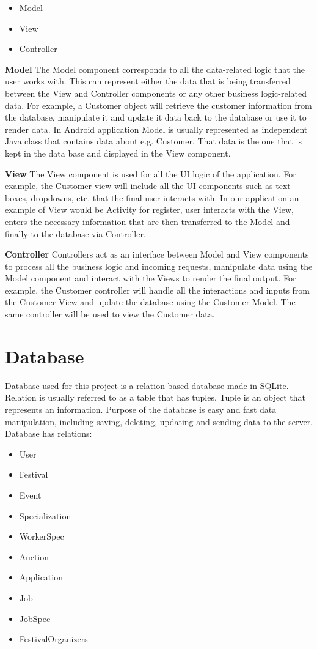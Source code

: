 		\begin{itemize}
			\item 	 Model
			\item 	 View
			\item 	 Controller		
		\end{itemize}

		\textbf{Model}
		 The Model component corresponds to all the data-related logic that the user works with. This can represent either the data that is being transferred between the View and Controller components or any other business logic-related data. For example, a Customer object will retrieve the customer information from the database, manipulate it and update it data back to the database or use it to render data. 
		In Android application Model is usually represented as independent Java class that contains data about e.g. Customer. That data is the one that is kept in the data base and displayed in the View component. 

		\textbf{View}
		 The View component is used for all the UI logic of the application. For example, the Customer view will include all the UI components such as text boxes, dropdowns, etc. that the final user interacts with. 
		In our application an example of View would be Activity for register, user interacts with the View, enters the necessary information that are then transferred to the Model and finally to the database via Controller.

		\textbf{Controller}
		 Controllers act as an interface between Model and View components to process all the business logic and incoming requests, manipulate data using the Model component and interact with the Views to render the final output. For example, the Customer controller will handle all the interactions and inputs from the Customer View and update the database using the Customer Model. The same controller will be used to view the Customer data.
\pagebreak
				
		\section{Database}
			
			
		 Database used for this project is a relation based database made in SQLite. Relation is usually referred to as a table that has tuples. Tuple is an object that represents an information. Purpose of the database is easy and fast data manipulation, including saving, deleting, updating and sending data to the server. Database has relations:
		\begin{itemize}
			\item 	 User
			\item 	 Festival
			\item 	 Event
			\item 	 Specialization
			\item 	 WorkerSpec
			\item 	 Auction
			\item 	 Application
			\item 	 Job
			\item 	 JobSpec
			\item 	 FestivalOrganizers
		\end{itemize}
		\pagebreak
